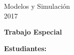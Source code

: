 \begin{titlepage}

  \begin{center}
    \vspace{15mm}
    \begin{Huge}
      Modelos y Simulación \\
      2017 \\
    \end{Huge}
  \end{center}

  \vspace{7mm}
  \begin{center}
    \begin{Large}
      \textbf{Trabajo Especial}
    \end{Large}
  \end{center}

  \vspace{20mm}
  \begin{Large}
    \begin{center}

        \textbf{Estudiantes:}


    \end{center}

  \end{Large}

\end{titlepage}
